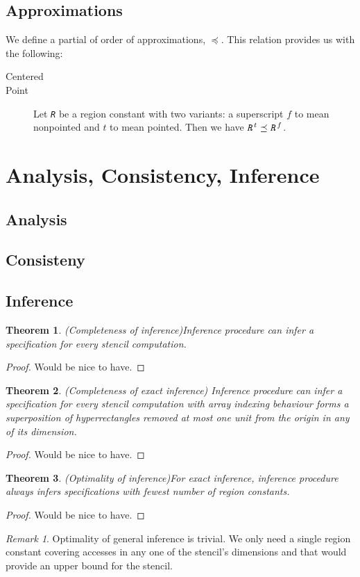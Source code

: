 \documentclass{article}
\theoremstyle{definition}
\theoremstyle{plain}
\newtheorem{thm}{Theorem}
\theoremstyle{remark}
\newtheorem{remark}{Remark}
\newcommand{\textcap}[1]{\texttt{\textit{#1}}}
\begin{document}
\subsection{Approximations}
We define a partial of order of approximations, $\preceq$. This relation
provides us with the following:

\begin{description}
  \item[Centered]
  \item[Point] Let \textcap{R} be a region constant with two variants: a
    superscript $f$ to mean nonpointed and $t$ to mean pointed. Then we have
    $\textcap{R}^t \preceq \textcap{R}^f$.
\end{description}

\section{Analysis, Consistency, Inference}

\subsection{Analysis}

\subsection{Consisteny}

\subsection{Inference}

\begin{thm}{(Completeness of inference)}\label{thm:inf-completeness}
  Inference procedure can infer a specification for every stencil computation.
\end{thm}
%
\begin{proof}
  Would be nice to have.
\end{proof}

\begin{thm}{(Completeness of exact inference)}
  Inference procedure can infer a specification for every stencil computation
  with array indexing behaviour forms a superposition of hyperrectangles removed
  at most one unit from the origin in any of its dimension.
\end{thm}
%
\begin{proof}
  Would be nice to have.
\end{proof}

\begin{thm}{(Optimality of inference)}\label{thm:inf-optimality}
  For exact inference, inference procedure always infers specifications with
  fewest number of region constants.
\end{thm}
%
\begin{proof}
  Would be nice to have.
\end{proof}

\begin{remark}{}
  Optimality of general inference is trivial. We only need a single region
  constant covering accesses in any one of the stencil's dimensions and that
  would provide an upper bound for the stencil.
\end{remark}
\end{document}
